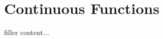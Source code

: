 \documentclass[../../templates/section]{subfiles}
\begin{document}
\section{Continuous Functions}\label{sec:continuous-functions}

filler content...
\end{document}
